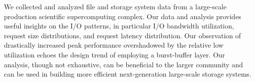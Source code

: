 
We collected and analyzed file and storage system data from a large-scale
production scientific supercomputing complex. Our data and analysis provides
useful insights on the I/O patterns, in particular I/O bandwidth utilization,
request size distributions, and request latency distribution. Our observation of
drastically increased peak performance overshadowed by the relative low
utilization echoes the design trend of employing a burst-buffer layer. Our
analysis, though not exhaustive, can be beneficial to the
larger community and can be used in building more efficient next-generation
large-scale storage systems.
